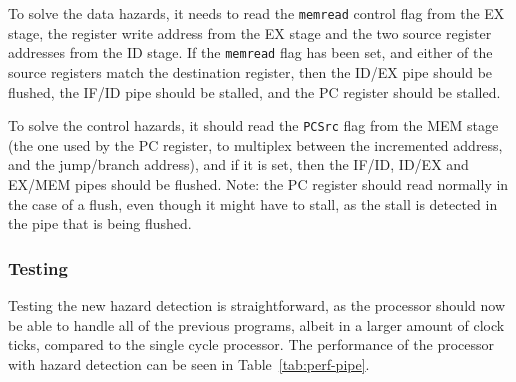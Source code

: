 To solve the data hazards, it needs to read the \texttt{memread} control flag
from the EX stage, the register write address from the EX stage and the two
source register addresses from the ID stage. If the \texttt{memread} flag has
been set, and either of the source registers match the destination register,
then the ID/EX pipe should be flushed, the IF/ID pipe should be stalled, and
the PC register should be stalled.

To solve the control hazards, it should read the \texttt{PCSrc} flag from the
MEM stage (the one used by the PC register, to multiplex between the
incremented address, and the jump/branch address), and if it is set, then the
IF/ID, ID/EX and EX/MEM pipes should be flushed. Note: the PC register should
read normally in the case of a flush, even though it might have to stall, as
the stall is detected in the pipe that is being flushed.

\subsubsection*{Testing}
Testing the new hazard detection is straightforward, as the processor should
now be able to handle all of the previous programs, albeit in a larger amount
of clock ticks, compared to the single cycle processor. The performance of the
processor with hazard detection can be seen in Table~\ref{tab:perf-pipe}.

